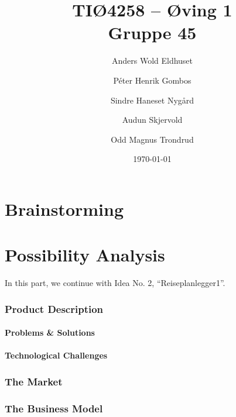 \documentclass[a4paper]{article}
\title{TIØ4258 -- Øving 1 \\ Gruppe 45}
\author{
    Anders Wold Eldhuset \and
    Péter Henrik Gombos \and
    Sindre Haneset Nygård \and
    Audun Skjervold \and
    Odd Magnus Trondrud
}
\date{\today}
\begin{document}
    \maketitle
    \newpage
    \setcounter{secnumdepth}{2}

    \part{Brainstorming}
    	

    \part{Possibility Analysis}
    	In this part, we continue with Idea No. 2, ``Reiseplanlegger1''.
    	\section{Product Description}
    		\subsection{Problems \& Solutions}
	    		
    		\subsection{Technological Challenges}
	    			
	    \section{The Market} %
            

            

            

            

	    \section{The Business Model}
            
\end{document}
